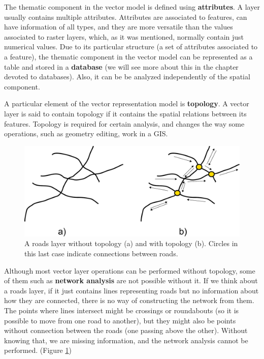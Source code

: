 The thematic component in the vector model is defined using \textbf{attributes}. A layer usually contains multiple attributes. Attributes are associated to features, can have information of all types, and they are more versatile than the values associated to raster layers, which, as it was mentioned, normally contain just numerical values. Due to its particular structure (a set of attributes associated to a feature), the thematic component in the vector model can be represented as a table and stored in a \textbf{database} (we will see more about this in the chapter devoted to databases). Also, it can be be analyzed independently of the spatial component.

A particular element of the vector representation model is \textbf{topology}. A vector layer is said to contain topology if it contains the spatial relations between its features. Topology is required for certain analysis, and changes the way some operations, such as geometry editing, work in a GIS.

\begin{figure}[!hbt]   
\centering
\includegraphics[width=.8\columnwidth]{Data/Topology_roads.pdf}
\caption{\small A roads layer without topology (a) and with topology (b). Circles in this last case indicate connections between roads.}
\label{Fig:Topology_roads} 
\end{figure}

Although most vector layer operations can be performed without topology, some of them such as \textbf{network analysis} are not possible without it. If we think about a roads layer, if it just contains lines representing roads but no information about how they are connected, there is no way of constructing the network from them. The points where lines intersect might be crossings or roundabouts (so it is possible to move from one road to another), but they might also be points without connection between the roads (one passing above the other). Without knowing that, we are missing information, and the network analysis cannot be performed. (Figure \ref{Fig:Topology_roads})

